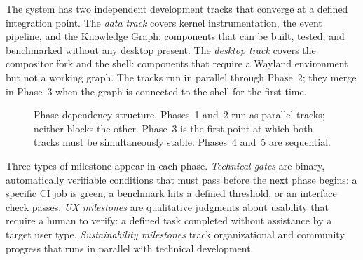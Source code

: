 The system has two independent development tracks that converge at a defined
integration point. The \emph{data track} covers kernel instrumentation, the
event pipeline, and the Knowledge Graph: components that can be built, tested,
and benchmarked without any desktop present. The \emph{desktop track} covers
the compositor fork and the shell: components that require a Wayland environment
but not a working graph. The tracks run in parallel through Phase~2; they
merge in Phase~3 when the graph is connected to the shell for the first time.

\begin{figure}[htbp]
\centering
{}
\caption{Phase dependency structure. Phases~1 and~2 run as parallel tracks;
neither blocks the other. Phase~3 is the first point at which both tracks must
be simultaneously stable. Phases~4 and~5 are sequential.}
\label{fig:roadmap}
\end{figure}

Three types of milestone appear in each phase. \emph{Technical gates} are
binary, automatically verifiable conditions that must pass before the next
phase begins: a specific CI job is green, a benchmark hits a defined threshold,
or an interface check passes. \emph{UX milestones} are qualitative judgments
about usability that require a human to verify: a defined task completed
without assistance by a target user type. \emph{Sustainability milestones}
track organizational and community progress that runs in parallel with
technical development.


